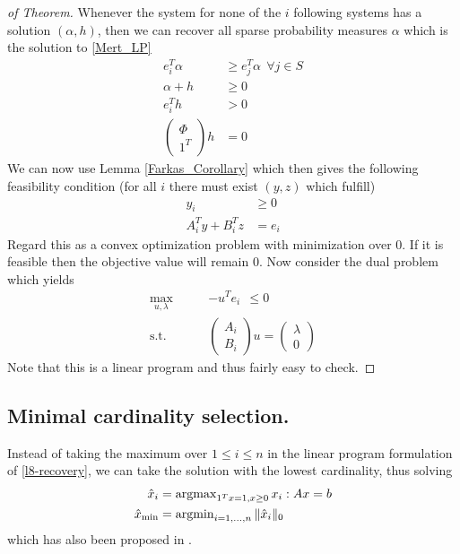 \documentclass{article} %
\begin{document}
\begin{proof}[of Theorem]
Whenever the system for none of the $i$ following systems has a solution $(\alpha,h)$, then we can recover all sparse probability measures $\alpha$ which is the solution to \eqref{Mert_LP} 
\begin{align*}
e_i^T\alpha &\geq e_j^T \alpha \:\: \forall j \in S\\
\alpha + h &\geq 0\\
e_i^T h &> 0\\
\begin{pmatrix}\Phi\\ 1^T\end{pmatrix} h &= 0
\end{align*}
We can now use Lemma \ref{Farkas_Corollary} which then gives the following feasibility condition (for all $i$ there must exist  $(y,z)$ which fulfill)
\begin{align*}
\label{Maxrecovery_condition_Feasibility}
y_i &\geq 0\\
A_i^Ty + B_i^T z &= e_i
\end{align*}
Regard this as a convex optimization problem with minimization over $0$. If it is feasible then the objective value will remain 0. Now consider the dual problem which yields
\begin{align*}
\label{Maxrecovery_condition_Dual}
\max_{u,\lambda} \qquad &- u^T e_i\:\: \leq 0\\
\text{s.t.} \qquad& \begin{pmatrix} A_i\\ B_i \end{pmatrix} u = \begin{pmatrix} \lambda \\ 0\end{pmatrix}
\end{align*}
Note that this is a linear program and thus fairly easy to check. 
\end{proof}

\subsection{Minimal cardinality selection.} 
Instead of taking the maximum over $1\leq i\leq n$ in the linear program formulation of \eqref{l8-recovery}, we can take the solution with the lowest cardinality, thus solving
\begin{align}
\hat{x}_i &= \operatorname{argmax}_{1^Tx =1, x\geq 0} x_i : Ax  = b \label{min-cardinality}\\
\hat{x}_{\min} &= \operatorname{argmin}_{i=1, \dots, n} \|\hat{x}_i\|_0 \nonumber
\end{align}
which has also been proposed in \cite{mert}.
\end{document}
